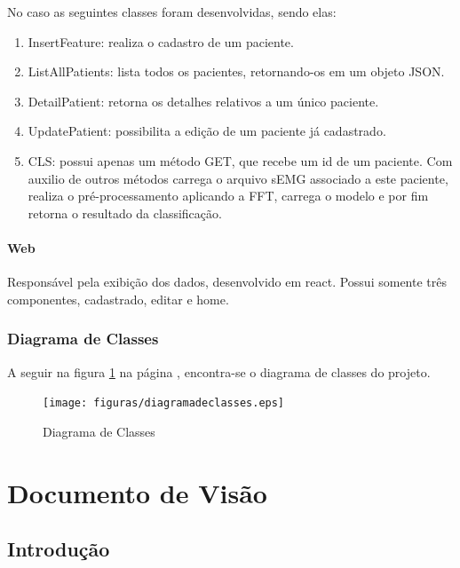 \begin{anexosenv}
	No caso as seguintes classes foram desenvolvidas, sendo elas:
	\begin{enumerate}
		\item InsertFeature: realiza o cadastro de um paciente.
		\item ListAllPatients: lista todos os pacientes, retornando-os em um objeto JSON.
		\item DetailPatient: retorna os detalhes relativos a um único paciente.
		\item UpdatePatient: possibilita a edição de um paciente já cadastrado.
		\item CLS: possui apenas um método GET, que recebe um id de um paciente. Com auxilio de outros métodos carrega o arquivo sEMG associado a este paciente, realiza o pré-processamento aplicando a FFT, carrega o modelo e por fim retorna o resultado da classificação.
	\end{enumerate}

	\subsubsection{Web}
	Responsável pela exibição dos dados, desenvolvido em react. Possui somente três componentes, cadastrado, editar e home.

    \subsection{Diagrama de Classes}
    A seguir na figura \ref{diagramadeclasses} na página \pageref{diagramadeclasses}, encontra-se o diagrama de classes do projeto.
    \begin{figure}[!htb]
		\centering
		\texttt{[image: figuras/diagramadeclasses.eps]}
		\caption{Diagrama de Classes}
		\label{diagramadeclasses}
    \end{figure}
    
    

	\chapter[Documento de Visão]{Documento de Visão}
	\label{adocvisao}

	\section{Introdução}


\end{anexosenv}
